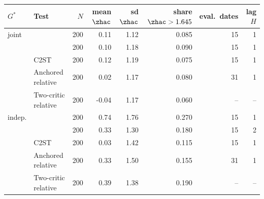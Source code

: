 \begin{tabular}{llrrrrrr}
\toprule
$G^*$ & Test & $N$ & mean $\zhac$ & sd $\zhac$ & share $\zhac>1.645$ & eval.\ dates & lag $H$ \\
\midrule
joint & \WC{} & 200 & 0.11 & 1.12 & 0.085 & 15 & 1 \\
 & \LRC{} & 200 & 0.10 & 1.18 & 0.090 & 15 & 1 \\
 & C2ST & 200 & 0.12 & 1.19 & 0.075 & 15 & 1 \\
 & Anchored relative & 200 & 0.02 & 1.17 & 0.080 & 31 & 1 \\
 & Two-critic relative & 200 & -0.04 & 1.17 & 0.060 & -- & -- \\
\addlinespace[2pt]
indep. & \WC{} & 200 & 0.74 & 1.76 & 0.270 & 15 & 1 \\
 & \LRC{} & 200 & 0.33 & 1.30 & 0.180 & 15 & 2 \\
 & C2ST & 200 & 0.03 & 1.42 & 0.115 & 15 & 1 \\
 & Anchored relative & 200 & 0.33 & 1.50 & 0.155 & 31 & 1 \\
 & Two-critic relative & 200 & 0.39 & 1.38 & 0.190 & -- & -- \\
\bottomrule
\end{tabular}
